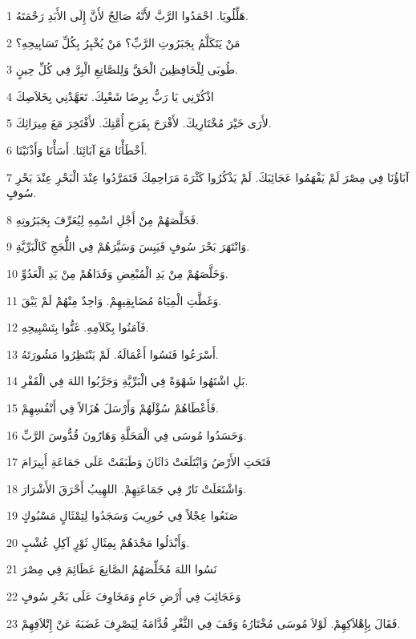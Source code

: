 \par 1 هَلِّلُويَا. احْمَدُوا الرَّبَّ لأَنَّهُ صَالِحٌ لأَنَّ إِلَى الأَبَدِ رَحْمَتَهُ.
\par 2 مَنْ يَتَكَلَّمُ بِجَبَرُوتِ الرَّبِّ؟ مَنْ يُخْبِرُ بِكُلِّ تَسَابِيحِهِ؟
\par 3 طُوبَى لِلْحَافِظِينَ الْحَقَّ وَلِلصَّانِعِ الْبِرَّ فِي كُلِّ حِينٍ.
\par 4 اذْكُرْنِي يَا رَبُّ بِرِضَا شَعْبِكَ. تَعَهَّدْنِي بِخَلاَصِكَ
\par 5 لأَرَى خَيْرَ مُخْتَارِيكَ. لأَفْرَحَ بِفَرَحِ أُمَّتِكَ. لأَفْتَخِرَ مَعَ مِيرَاثِكَ.
\par 6 أَخْطَأْنَا مَعَ آبَائِنَا. أَسَأْنَا وَأَذْنَبْنَا.
\par 7 آبَاؤُنَا فِي مِصْرَ لَمْ يَفْهَمُوا عَجَائِبَكَ. لَمْ يَذْكُرُوا كَثْرَةَ مَرَاحِمِكَ فَتَمَرَّدُوا عِنْدَ الْبَحْرِ عِنْدَ بَحْرِ سُوفٍ.
\par 8 فَخَلَّصَهُمْ مِنْ أَجْلِ اسْمِهِ لِيُعَرِّفَ بِجَبَرُوتِهِ.
\par 9 وَانْتَهَرَ بَحْرَ سُوفٍ فَيَبِسَ وَسَيَّرَهُمْ فِي اللُّجَجِ كَالْبَرِّيَّةِ.
\par 10 وَخَلَّصَهُمْ مِنْ يَدِ الْمُبْغِضِ وَفَدَاهُمْ مِنْ يَدِ الْعَدُوِّ.
\par 11 وَغَطَّتِ الْمِيَاهُ مُضَايِقِيهِمْ. وَاحِدٌ مِنْهُمْ لَمْ يَبْقَ.
\par 12 فَآمَنُوا بِكَلاَمِهِ. غَنُّوا بِتَسْبِيحِهِ.
\par 13 أَسْرَعُوا فَنَسُوا أَعْمَالَهُ. لَمْ يَنْتَظِرُوا مَشُورَتَهُ.
\par 14 بَلِ اشْتَهُوا شَهْوَةً فِي الْبَرِّيَّةِ وَجَرَّبُوا اللهَ فِي الْقَفْرِ.
\par 15 فَأَعْطَاهُمْ سُؤْلَهُمْ وَأَرْسَلَ هُزَالاً فِي أَنْفُسِهِمْ.
\par 16 وَحَسَدُوا مُوسَى فِي الْمَحَلَّةِ وَهَارُونَ قُدُّوسَ الرَّبِّ.
\par 17 فَتَحَتِ الأَرْضُ وَابْتَلَعَتْ دَاثَانَ وَطَبَقَتْ عَلَى جَمَاعَةِ أَبِيرَامَ
\par 18 وَاشْتَعَلَتْ نَارٌ فِي جَمَاعَتِهِمْ. اللهِيبُ أَحْرَقَ الأَشْرَارَ.
\par 19 صَنَعُوا عِجْلاً فِي حُورِيبَ وَسَجَدُوا لِتِمْثَالٍ مَسْبُوكٍ
\par 20 وَأَبْدَلُوا مَجْدَهُمْ بِمِثَالِ ثَوْرٍ آكِلِ عُشْبٍ.
\par 21 نَسُوا اللهَ مُخَلِّصَهُمُ الصَّانِعَ عَظَائِمَ فِي مِصْرَ
\par 22 وَعَجَائِبَ فِي أَرْضِ حَامٍ وَمَخَاوِفَ عَلَى بَحْرِ سُوفٍ
\par 23 فَقَالَ بِإِهْلاَكِهِمْ. لَوْلاَ مُوسَى مُخْتَارُهُ وَقَفَ فِي الثَّغْرِ قُدَّامَهُ لِيَصْرِفَ غَضَبَهُ عَنْ إِتْلاَفِهِمْ.
